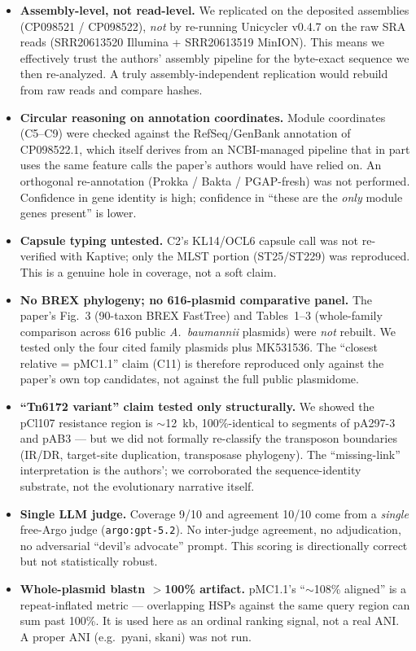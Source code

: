 \documentclass[11pt]{article}
\begin{document}
\begin{itemize}
  \item \textbf{Assembly-level, not read-level.} We replicated on the deposited assemblies (CP098521 / CP098522), \emph{not} by re-running Unicycler v0.4.7 on the raw SRA reads (SRR20613520 Illumina + SRR20613519 MinION). This means we effectively trust the authors' assembly pipeline for the byte-exact sequence we then re-analyzed. A truly assembly-independent replication would rebuild from raw reads and compare hashes.
  \item \textbf{Circular reasoning on annotation coordinates.} Module coordinates (C5--C9) were checked against the RefSeq/GenBank annotation of CP098522.1, which itself derives from an NCBI-managed pipeline that in part uses the same feature calls the paper's authors would have relied on. An orthogonal re-annotation (Prokka / Bakta / PGAP-fresh) was not performed. Confidence in gene identity is high; confidence in ``these are the \emph{only} module genes present'' is lower.
  \item \textbf{Capsule typing untested.} C2's KL14/OCL6 capsule call was not re-verified with Kaptive; only the MLST portion (ST25/ST229) was reproduced. This is a genuine hole in coverage, not a soft claim.
  \item \textbf{No BREX phylogeny; no 616-plasmid comparative panel.} The paper's Fig.~3 (90-taxon BREX FastTree) and Tables~1--3 (whole-family comparison across 616 public \textit{A.~baumannii} plasmids) were \emph{not} rebuilt. We tested only the four cited family plasmids plus MK531536. The ``closest relative = pMC1.1'' claim (C11) is therefore reproduced only against the paper's own top candidates, not against the full public plasmidome.
  \item \textbf{``Tn6172 variant'' claim tested only structurally.} We showed the pCl107 resistance region is $\sim$12~kb, 100\%-identical to segments of pA297-3 and pAB3 --- but we did not formally re-classify the transposon boundaries (IR/DR, target-site duplication, transposase phylogeny). The ``missing-link'' interpretation is the authors'; we corroborated the sequence-identity substrate, not the evolutionary narrative itself.
  \item \textbf{Single LLM judge.} Coverage 9/10 and agreement 10/10 come from a \emph{single} free-Argo judge (\texttt{argo:gpt-5.2}). No inter-judge agreement, no adjudication, no adversarial ``devil's advocate'' prompt. This scoring is directionally correct but not statistically robust.
  \item \textbf{Whole-plasmid blastn $>$100\% artifact.} pMC1.1's ``$\sim$108\% aligned'' is a repeat-inflated metric --- overlapping HSPs against the same query region can sum past 100\%. It is used here as an ordinal ranking signal, not a real ANI. A proper ANI (e.g.\ pyani, skani) was not run.

\end{itemize}
\end{document}
